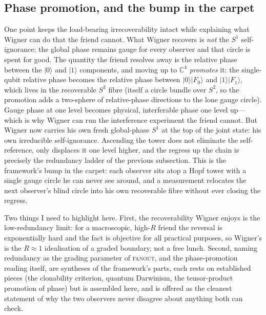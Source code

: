 \subsection{Phase promotion, and the bump in the carpet}
\label{sec:wf-phase-promotion}

One point keeps the load-bearing irrecoverability intact while explaining what
Wigner can do that the friend cannot. What Wigner recovers is \emph{not} the
$S^{1}$ self-ignorance; the global phase remains gauge for every observer and that
circle is spent for good. The quantity the friend resolves away is the relative
phase between the $\lvert 0\rangle$ and $\lvert 1\rangle$ components, and moving up
to $\mathbb{C}^{4}$ \emph{promotes} it: the single-qubit relative phase becomes the
relative phase between $\lvert 0\rangle\lvert F_{0}\rangle$ and
$\lvert 1\rangle\lvert F_{1}\rangle$, which lives in the recoverable $S^{3}$ fibre
(itself a circle bundle over $S^{2}$, so the promotion adds a two-sphere of
relative-phase directions to the lone gauge circle). Gauge phase at one level
becomes physical, interferable phase one level up---which is why Wigner can run
the interference experiment the friend cannot. But Wigner now carries his own
fresh global-phase $S^{1}$ at the top of the joint state: his own irreducible
self-ignorance. Ascending the tower does not eliminate the self-reference, only
displaces it one level higher, and the regress up the chain is precisely the
redundancy ladder of the previous subsection. This is the framework's bump in the
carpet: each observer sits atop a Hopf tower with a single gauge circle he can
never see around, and a measurement relocates the next observer's blind circle
into his own recoverable fibre without ever closing the regress.

Two things I need to highlight here. First, the recoverability Wigner
enjoys is the low-redundancy limit: for a macroscopic, high-$R$ friend the
reversal is exponentially hard and the fact is objective for all practical
purposes, so Wigner's  is the $R\!\approx\!1$ idealisation of a
graded boundary, not a free lunch. Second, naming redundancy as the grading
parameter of \textsc{fanout}, and the phase-promotion reading itself, are
syntheses of the framework's parts, each rests on established pieces (the
clonability criterion, quantum Darwinism, the tensor-product promotion of phase)
but is assembled here, and is offered as the cleanest statement of why the two
observers never disagree about anything both can check.


